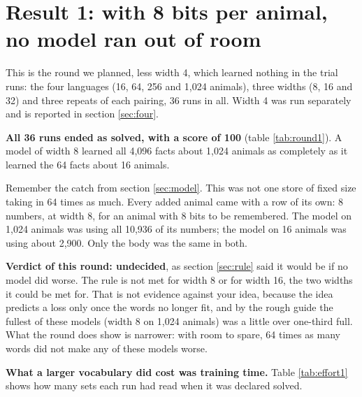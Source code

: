 \section{Result 1: with 8 bits per animal, no model ran out of room}\label{sec:round1}

This is the round we planned, less width 4, which learned nothing in the trial runs: the four
languages (16, 64, 256 and 1,024 animals), three widths (8, 16 and 32) and three repeats of each
pairing, 36 runs in all. Width 4 was run separately and is reported in section \ref{sec:four}.

\begin{table}[H]
\centering\small

\caption{Facts known (0 to 100) at the end of each run, with 8 bits per animal. Each entry
covers three repeats; a single number means all three gave that score.}
\label{tab:round1}
\end{table}

\textbf{All 36 runs ended as solved, with a score of 100} (table \ref{tab:round1}). A model of
width 8 learned all 4,096 facts about 1,024 animals as completely as it learned the 64 facts
about 16 animals.

Remember the catch from section \ref{sec:model}. This was not one store of fixed size taking in
64 times as much. Every added animal came with a row of its own: 8 numbers, at width 8, for an
animal with 8 bits to be remembered. The model on 1,024 animals was using all 10,936 of its
numbers; the model on 16 animals was using about 2,900. Only the body was the same in both.

\textbf{Verdict of this round: undecided}, as section \ref{sec:rule} said it would be if no
model did worse. The rule is not met for width 8 or for width 16, the two widths it could be
met for. That is not evidence against your idea, because the idea predicts a loss only once
the words no longer fit, and by the rough guide the fullest of these models (width 8 on 1,024
animals) was a little over one-third full. What the round does show is narrower: with room to
spare, 64 times as many words did not make any of these models worse.

\textbf{What a larger vocabulary did cost was training time.} Table \ref{tab:effort1} shows
how many sets each run had read when it was declared solved.

\begin{table}[H]
\centering\small

\caption{Sets of training text read before each run was solved, for the three repeats,
smallest first. Runs are graded only after certain numbers of sets and must pass twice in a
row, so these figures move in jumps, and two equal figures may hide a real difference.}
\label{tab:effort1}
\end{table}

